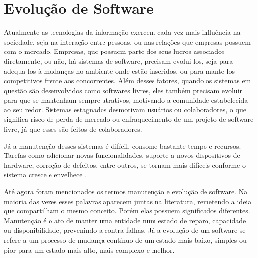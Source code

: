 \chapter{Evolução de Software}




Atualmente as tecnologias da informação exercem cada vez mais influência na sociedade, seja na interação entre pessoas, ou nas relações que empresas possuem com o mercado. Empresas, que possuem parte dos seus lucros associados diretamente, ou não, há sistemas de software, precisam evolui-los, seja para adequa-los à mudanças no ambiente onde estão inseridos, ou para mante-los competitivos frente aos concorrentes. Além desses fatores, quando os sistemas em questão são desenvolvidos como softwares livres, eles também precisam evoluir para que se mantenham sempre atrativos, motivando a comunidade estabelecida ao seu redor. Sistemas estagnados desmotivam usuários ou colaboradores, o que significa risco de perda de mercado ou enfraquecimento de um projeto de software livre, já que esses são feitos de colaboradores.

Já a manutenção desses sistemas é difícil, consome bastante tempo e recursos. Tarefas como adicionar novas funcionalidades, suporte a novos dispositivos de hardware, correção de defeitos, entre outros, se tornam mais difíceis conforme o sistema cresce e envelhece \cite{godfrey2000evolution}.

Até agora foram mencionados os termos manutenção e evolução de software. Na maioria das vezes esses palavras aparecem juntas na literatura, remetendo a ideia que compartilham o mesmo conceito. Porém elas possuem significados diferentes. Manutenção é o ato de manter uma entidade num estado de reparo, capacidade ou disponibilidade, prevenindo-a contra falhas. Já a evolução de um software se refere a um processo de mudança contínuo de um estado mais baixo, simples ou pior para um estado mais alto, mais complexo e melhor.

